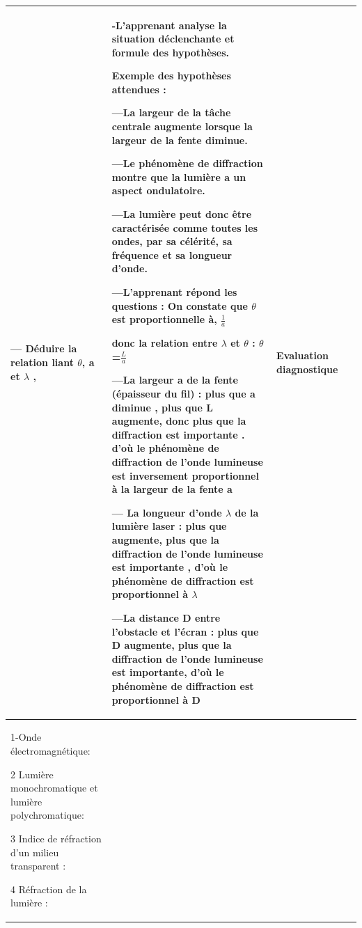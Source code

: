 \documentclass[12pt]{article}
\begin{document}
\begin{center}
\begin{tabular}{|p{}||p{}||p{}||p{}|}
--- Déduire la relation liant $\theta$, a et $\lambda$ ,

				  &
				  -L’apprenant analyse la situation déclenchante
et formule des hypothèses.

\textbf{Exemple des hypothèses attendues :}

---La largeur de la tâche centrale augmente lorsque la largeur de la fente diminue.

---Le phénomène de diffraction montre que la lumière a un aspect ondulatoire.

---La lumière peut donc être caractérisée comme toutes les ondes, par sa célérité, sa fréquence et sa
longueur d’onde.

\vspace{0.5cm}

---L’apprenant répond les questions : On constate que $\theta$ est proportionnelle à, $\frac{1}{a}$


donc la relation entre $\lambda$ et $\theta$ : $\theta $=$\frac{L}{a}$


---La largeur a de la fente (épaisseur du fil) : plus que a diminue , plus que L augmente, donc plus que
la diffraction est importante . d’où le phénomène de diffraction de l’onde lumineuse est inversement
proportionnel à la largeur de la fente a

--- La longueur d’onde $\lambda$ de la lumière laser : plus que augmente, plus que la diffraction de l’onde
lumineuse est importante , d’où le phénomène de diffraction est proportionnel à $\lambda$

---La distance D entre l’obstacle et l’écran : plus que D augmente, plus que la diffraction de l’onde
lumineuse est importante, d’où le phénomène de diffraction est proportionnel à D
				  &
				  Evaluation
diagnostique\\\hline


\color{red}{II-  Caractéristiques des ondes lumineuses}

\color{blue}1-Onde électromagnétique:

\color{blue}2
Lumière monochromatique et lumière polychromatique:

\color{blue}3
Indice de réfraction d’un milieu transparent :

\color{blue}4
Réfraction de la lumière :



\end{tabular}
\end{center}
\end{document}
